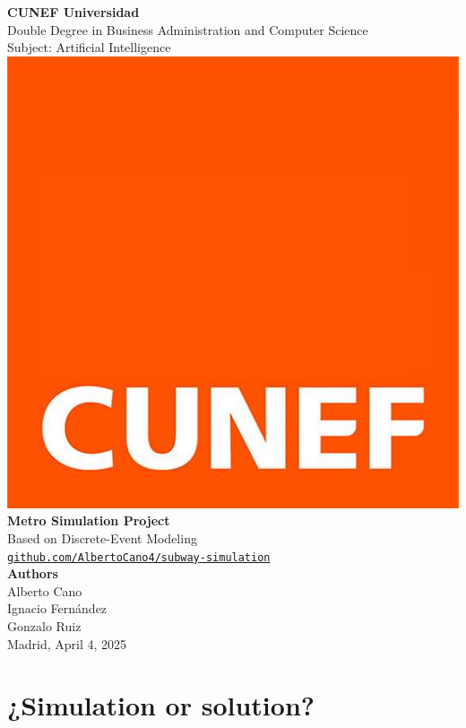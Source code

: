 \documentclass[a4paper,11pt,oneside]{book}
\begin{document}
\frontmatter

\begin{titlepage}
    \begin{center}

        {\LARGE \textbf{CUNEF Universidad}}\\[0.4cm]
        {\large Double Degree in Business Administration and Computer Science}\\
        {\large Subject: Artificial Intelligence}\\[2cm]

        \includegraphics[width=0.35\linewidth]{cunef.jpg}\\[2.5cm]

        {\Huge \textbf{Metro Simulation Project}}\\[0.4cm]
        {\Large Based on Discrete-Event Modeling}\\[1.2cm]

        \href{https://github.com/AlbertoCano4/subway-simulation}{\texttt{github.com/AlbertoCano4/subway-simulation}}\\[2cm]

        {\Large \textbf{Authors}}\\[0.3cm]
        {\large Alberto Cano\\
        Ignacio Fernández\\
        Gonzalo Ruiz}\\[2.5cm]

        \vfill
        {\large Madrid, April 4, 2025}

    \end{center}
\end{titlepage}

    \newpage
    \thispagestyle{empty}
    \chapter*{\centering \Large ¿Simulation or solution?}
\end{document}
